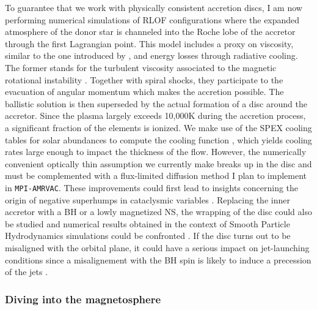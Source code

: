 \documentclass[a4paper,12pt,onecolumn]{article}
\begin{document}
To guarantee that we work with physically consistent accretion discs, I am now performing numerical simulations of RLOF configurations where the expanded atmosphere of the donor star is channeled into the Roche lobe of the accretor through the first Lagrangian point. This model includes a proxy on viscosity, similar to the one introduced by \cite{Shakura1973}, and energy losses through radiative cooling. The former stands for the turbulent viscosity associated to the magnetic rotational instability \citep{Balbus1991}. Together with spiral shocks, they participate to the evacuation of angular momentum which makes the accretion possible. The ballistic solution is then superseded by the actual formation of a disc around the accretor. Since the plasma largely exceeds 10,000K during the accretion process, a significant fraction of the elements is ionized. We make use of the SPEX cooling tables for solar abundances to compute the cooling function \citep{VanMarle2011}, which yields cooling rates large enough to impact the thickness of the flow. However, the numerically convenient optically thin assumption we currently make breaks up in the disc and must be complemented with a flux-limited diffusion method I plan to implement in \texttt{MPI-AMRVAC}. These improvements could first lead to insights concerning the origin of negative superhumps in cataclysmic variables \citep[CV, ][]{Murray1998}. Replacing the inner accretor with a BH or a lowly magnetized NS, the wrapping of the disc could also be studied and numerical results obtained in the context of Smooth Particle Hydrodynamics simulations could be confronted \citep{Foulkes2006}. If the disc turns out to be misaligned with the orbital plane, it could have a serious impact on jet-launching conditions since a misalignement with the BH spin is likely to induce a precession of the jets \cite{Liska2017}.
  
\subsubsection*{Diving into the magnetosphere}
\end{document}
